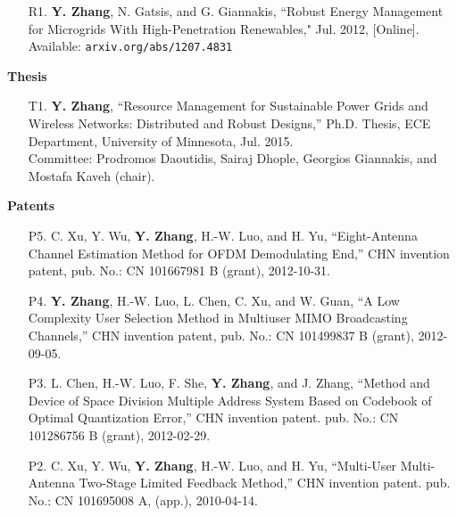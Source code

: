 \documentclass[margin,line]{res}
\begin{document}
\begin{resume}
\begin{enumerate}
\item[R1.]	\textbf{Y. Zhang}, N. Gatsis, and G. Giannakis,
``Robust Energy Management for Microgrids With High-Penetration Renewables,"
 Jul. 2012, [Online]. Available: \texttt{arxiv.org/abs/1207.4831}

\end{enumerate}

\vspace{.2cm}

{\bf Thesis}

\vspace{.2cm}

\begin{enumerate}


\item[T1.] \textbf{Y. Zhang}, ``Resource Management for Sustainable Power Grids and Wireless Networks: Distributed and Robust Designs,'' Ph.D. Thesis, ECE Department, University of Minnesota, Jul. 2015.\\
    Committee: Prodromos Daoutidis, Sairaj Dhople, Georgios Giannakis, and Mostafa Kaveh (chair).

\end{enumerate}

\vspace{.2cm}

{\bf Patents}

\vspace{.2cm}

\begin{enumerate}


\item[P5.] C. Xu, Y. Wu, \textbf{Y. Zhang}, H.-W. Luo, and H. Yu,
``Eight-Antenna Channel Estimation Method for OFDM Demodulating End,'' CHN invention patent,
pub. No.: CN 101667981 B (grant), 2012-10-31.

\item[P4.] \textbf{Y. Zhang}, H.-W. Luo, L. Chen, C. Xu, and W. Guan,
``A Low Complexity User Selection Method in Multiuser MIMO Broadcasting Channels,'' CHN invention patent,
pub. No.: CN 101499837 B (grant), 2012-09-05.


\item[P3.] L. Chen, H.-W. Luo, F. She, \textbf{Y. Zhang}, and J. Zhang,
``Method and Device of Space Division Multiple Address System Based on Codebook
of Optimal Quantization Error,'' CHN invention patent.
pub. No.: CN 101286756 B (grant), 2012-02-29.


\item[P2.] C. Xu, Y. Wu, \textbf{Y. Zhang}, H.-W. Luo, and H. Yu,
``Multi-User Multi-Antenna Two-Stage Limited Feedback Method,'' CHN invention patent.
pub. No.: CN 101695008 A, (app.), 2010-04-14.



\end{enumerate}
\end{resume}
\end{document}

